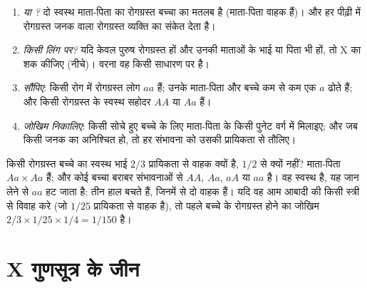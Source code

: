 \begin{method}[किसी वंशावली का विश्लेषण]\label{met:g11:genes-and-disease:analyse}
\begin{enumerate}
  \item \emph{ या ?} दो स्वस्थ माता-पिता का रोगग्रस्त
        बच्चा  का मतलब है (माता-पिता वाहक हैं)। और हर पीढ़ी में
        रोगग्रस्त जनक वाला रोगग्रस्त व्यक्ति  का संकेत देता है।
  \item \emph{किसी लिंग  पर?} यदि केवल पुरुष रोगग्रस्त हों और
        उनकी माताओं के भाई या पिता भी हों, तो X  का शक कीजिए
        (नीचे)। वरना वह  किसी साधारण  पर है।
  \item \emph{ सौंपिए}: किसी  रोग में रोगग्रस्त लोग $aa$
        हैं; उनके माता-पिता और बच्चे कम से कम एक $a$ ढोते हैं; और किसी
        रोगग्रस्त के स्वस्थ सहोदर $AA$ या $Aa$ हैं।
  \item \emph{जोखिम निकालिए}: किसी सोचे हुए बच्चे के लिए माता-पिता के
         किसी पुनेट वर्ग में मिलाइए; और जब किसी जनक का 
        अनिश्चित हो, तो हर संभावना को उसकी प्रायिकता से तौलिए।
\end{enumerate}
\end{method}

\begin{example}[वे दो-तिहाई]\label{ex:g11:genes-and-disease:twothirds}
किसी रोगग्रस्त बच्चे का स्वस्थ भाई $2/3$ प्रायिकता से वाहक क्यों है,
$1/2$ से क्यों नहीं? माता-पिता $Aa \times Aa$ हैं; और कोई बच्चा बराबर संभावनाओं
से $AA$, $Aa$, $aA$ या $aa$ है। वह स्वस्थ है, यह जान लेने से $aa$ हट जाता
है: तीन हाल बचते हैं, जिनमें से दो वाहक हैं। यदि वह आम आबादी की किसी
स्त्री से विवाह करे (जो $1/25$ प्रायिकता से वाहक है), तो पहले बच्चे के
रोगग्रस्त होने का जोखिम
$2/3 \times 1/25 \times 1/4 = 1/150$ है।
\end{example}

\section{X गुणसूत्र के जीन}

